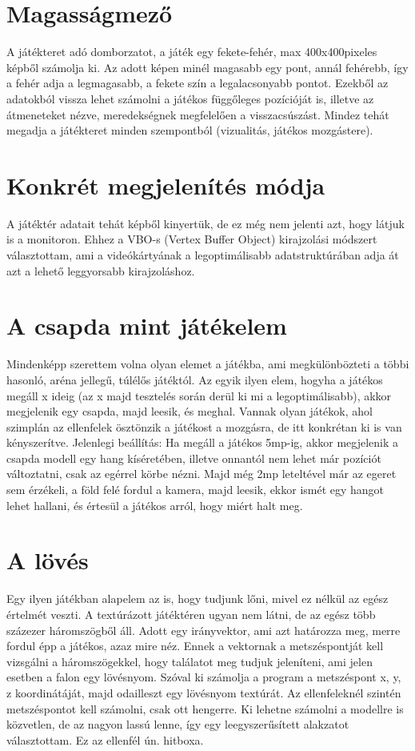 \section{Magasságmező}

A játékteret adó domborzatot, a játék egy fekete-fehér, max 400x400pixeles képből számolja ki. Az adott képen minél magasabb egy pont, annál fehérebb, így a fehér adja a legmagasabb, a fekete szín a legalacsonyabb pontot. Ezekből az adatokból vissza lehet számolni a játékos függőleges pozícióját is, illetve az átmeneteket nézve, meredekségnek megfelelően a visszacsúszást. Mindez tehát megadja a játékteret minden szempontból (vizualitás, játékos mozgástere).

\section{Konkrét megjelenítés módja}

A játéktér adatait tehát képből kinyertük, de ez még nem jelenti azt, hogy látjuk is a monitoron. Ehhez a VBO-s (Vertex Buffer Object) kirajzolási módszert választottam, ami a videókártyának a legoptimálisabb adatstruktúrában adja át azt a lehető leggyorsabb kirajzoláshoz.

\section{A csapda mint játékelem}

Mindenképp szerettem volna olyan elemet a játékba, ami megkülönbözteti a többi hasonló, aréna jellegű, túlélős játéktól. Az egyik ilyen elem, hogyha a játékos megáll x ideig (az x majd tesztelés során derül ki mi a legoptimálisabb), akkor megjelenik egy csapda, majd leesik, és meghal. Vannak olyan játékok, ahol szimplán az ellenfelek ösztönzik a játékost a mozgásra, de itt konkrétan ki is van kényszerítve. Jelenlegi beállítás:
Ha megáll a játékos 5mp-ig, akkor megjelenik a csapda modell egy hang kíséretében, illetve onnantól nem lehet már pozíciót változtatni, csak az egérrel körbe nézni. Majd még 2mp leteltével már az egeret sem érzékeli, a föld felé fordul a kamera, majd leesik, ekkor ismét egy hangot lehet hallani, és értesül a játékos arról, hogy miért halt meg.

\section{A lövés}

Egy ilyen játékban alapelem az is, hogy tudjunk lőni, mivel ez nélkül az egész értelmét veszti. A textúrázott játéktéren ugyan nem látni, de az egész több százezer háromszögből áll. Adott egy irányvektor, ami azt határozza meg, merre fordul épp a játékos, azaz mire néz. Ennek a vektornak a metszéspontját kell vizsgálni a háromszögekkel, hogy találatot meg tudjuk jeleníteni, ami jelen esetben a falon egy lövésnyom. Szóval ki számolja a program a metszéspont x, y, z koordinátáját, majd odailleszt egy lövésnyom textúrát. Az ellenfeleknél szintén metszéspontot kell számolni, csak ott hengerre. Ki lehetne számolni a modellre is közvetlen, de az nagyon lassú lenne, így egy leegyszerűsített alakzatot választottam. Ez az ellenfél ún. hitboxa.
